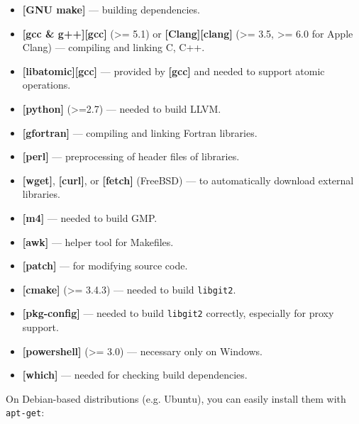 \begin{itemize}
\item \textbf{[GNU make]}                — building dependencies.


\item \textbf{[gcc \& g++][gcc]} (>= 5.1) or \textbf{[Clang][clang]} (>= 3.5, >= 6.0 for Apple Clang) — compiling and linking C, C++.


\item \textbf{[libatomic][gcc]}          — provided by \textbf{[gcc]} and needed to support atomic operations.


\item \textbf{[python]} (>=2.7)          — needed to build LLVM.


\item \textbf{[gfortran]}                — compiling and linking Fortran libraries.


\item \textbf{[perl]}                    — preprocessing of header files of libraries.


\item \textbf{[wget]}, \textbf{[curl]}, or \textbf{[fetch]} (FreeBSD) — to automatically download external libraries.


\item \textbf{[m4]}                      — needed to build GMP.


\item \textbf{[awk]}                     — helper tool for Makefiles.


\item \textbf{[patch]}                   — for modifying source code.


\item \textbf{[cmake]} (>= 3.4.3)        — needed to build \texttt{libgit2}.


\item \textbf{[pkg-config]}              — needed to build \texttt{libgit2} correctly, especially for proxy support.


\item \textbf{[powershell]} (>= 3.0)     — necessary only on Windows.


\item \textbf{[which]}                   — needed for checking build dependencies.

\end{itemize}


On Debian-based distributions (e.g. Ubuntu), you can easily install them with \texttt{apt-get}:




